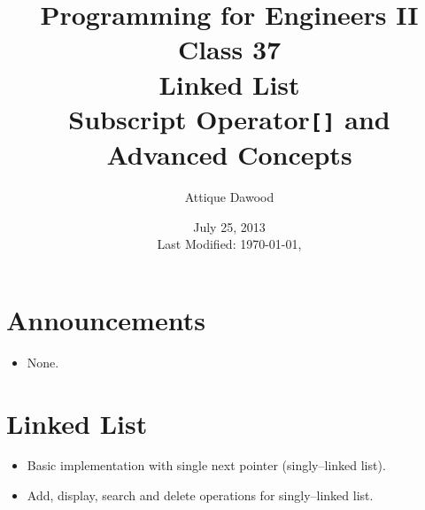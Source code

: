 \documentclass[12pt,a4paper]{article}
\title{\vspace{-2cm}Programming for Engineers II\\Class 37\\Linked List\\Subscript Operator\texttt{[]} and Advanced Concepts}
\author{Attique Dawood}
\date{July 25, 2013\\[0.2cm] Last Modified: \today, \currenttime}
\begin{document}
\maketitle
\section{Announcements}
\begin{itemize}
\item None.
\end{itemize}
\section{Linked List}
\begin{itemize}
\item Basic implementation with single next pointer (singly--linked list).
\item Add, display, search and delete operations for singly--linked list.
\end{itemize}
\end{document}

